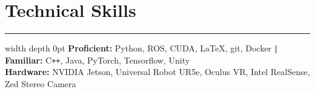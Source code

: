 \documentclass[11pt]{article}
\begin{document}
    \section*{Technical Skills}
    \hrule height 0.5pt width \textwidth depth 0pt \relax
    \vspace{0.1cm}
    \textbf{Proficient:} Python, ROS, CUDA, \LaTeX, git, Docker $\Vert$ \textbf{Familiar:}
    C\texttt{++}, Java, PyTorch, Tensorflow, Unity\\
    \textbf{Hardware:} NVIDIA Jetson, Universal Robot UR5e, Oculus VR, Intel RealSense, Zed
    Stereo Camera
\end{document}
